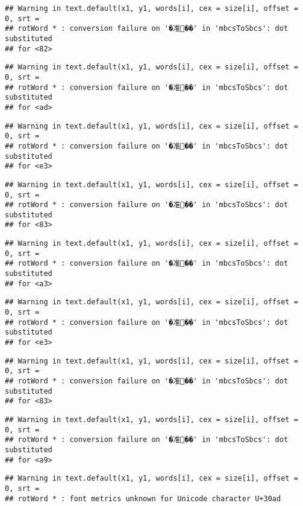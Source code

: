 \documentclass[]{article}
\begin{document}
\begin{verbatim}
## Warning in text.default(x1, y1, words[i], cex = size[i], offset = 0, srt =
## rotWord * : conversion failure on '�准��' in 'mbcsToSbcs': dot substituted
## for <82>
\end{verbatim}

\begin{verbatim}
## Warning in text.default(x1, y1, words[i], cex = size[i], offset = 0, srt =
## rotWord * : conversion failure on '�准��' in 'mbcsToSbcs': dot substituted
## for <ad>
\end{verbatim}

\begin{verbatim}
## Warning in text.default(x1, y1, words[i], cex = size[i], offset = 0, srt =
## rotWord * : conversion failure on '�准��' in 'mbcsToSbcs': dot substituted
## for <e3>
\end{verbatim}

\begin{verbatim}
## Warning in text.default(x1, y1, words[i], cex = size[i], offset = 0, srt =
## rotWord * : conversion failure on '�准��' in 'mbcsToSbcs': dot substituted
## for <83>
\end{verbatim}

\begin{verbatim}
## Warning in text.default(x1, y1, words[i], cex = size[i], offset = 0, srt =
## rotWord * : conversion failure on '�准��' in 'mbcsToSbcs': dot substituted
## for <a3>
\end{verbatim}

\begin{verbatim}
## Warning in text.default(x1, y1, words[i], cex = size[i], offset = 0, srt =
## rotWord * : conversion failure on '�准��' in 'mbcsToSbcs': dot substituted
## for <e3>
\end{verbatim}

\begin{verbatim}
## Warning in text.default(x1, y1, words[i], cex = size[i], offset = 0, srt =
## rotWord * : conversion failure on '�准��' in 'mbcsToSbcs': dot substituted
## for <83>
\end{verbatim}

\begin{verbatim}
## Warning in text.default(x1, y1, words[i], cex = size[i], offset = 0, srt =
## rotWord * : conversion failure on '�准��' in 'mbcsToSbcs': dot substituted
## for <a9>
\end{verbatim}

\begin{verbatim}
## Warning in text.default(x1, y1, words[i], cex = size[i], offset = 0, srt =
## rotWord * : font metrics unknown for Unicode character U+30ad
\end{verbatim}
\end{document}
